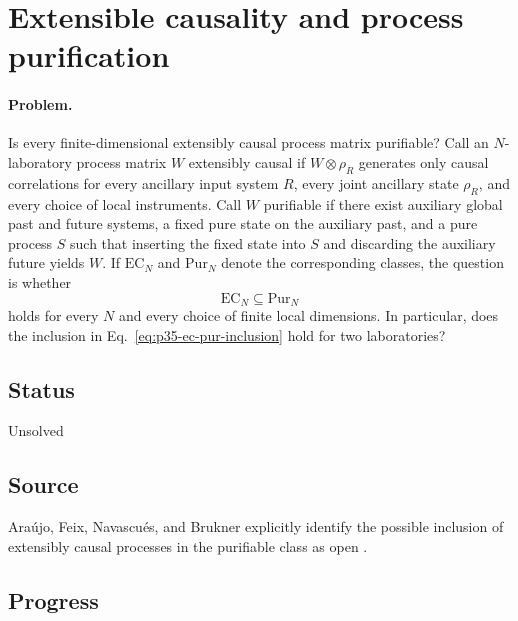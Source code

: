 \section{Extensible causality and process purification}
\label{sec:op_a9d8fc135ea71ca1}

\paragraph{Problem.}
Is every finite-dimensional extensibly causal process matrix purifiable?
Call an $N$-laboratory process matrix $W$ extensibly causal if
$W\otimes\rho_R$ generates only causal correlations for every ancillary
input system $R$, every joint ancillary state $\rho_R$, and every choice of
local instruments.  Call $W$ purifiable if there exist auxiliary global past
and future systems, a fixed pure state on the auxiliary past, and a pure
process $S$ such that inserting the fixed state into $S$ and discarding the
auxiliary future yields $W$.  If $\mathrm{EC}_N$ and $\mathrm{Pur}_N$ denote
the corresponding classes, the question is whether
\begin{equation}
  \mathrm{EC}_N\subseteq\mathrm{Pur}_N
  \label{eq:p35-ec-pur-inclusion}
\end{equation}
holds for every $N$ and every choice of finite local dimensions.  In
particular, does the inclusion in Eq.~\eqref{eq:p35-ec-pur-inclusion} hold for
two laboratories?

\subsection*{Status}

Unsolved

\subsection*{Source}

Ara\'ujo, Feix, Navascu\'es, and Brukner explicitly identify the possible
inclusion of extensibly causal processes in the purifiable class as open
.

\subsection*{Progress}

